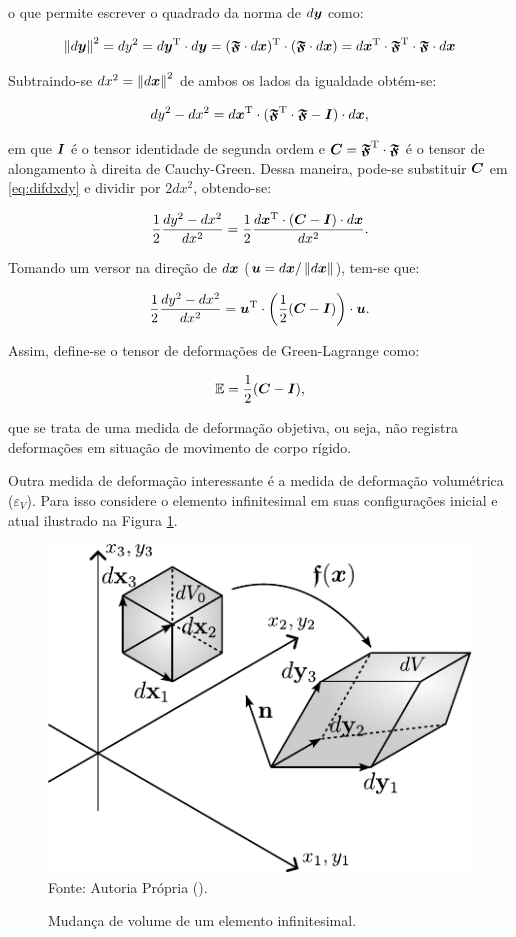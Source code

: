 \noindent o que permite escrever o quadrado da norma de $d\boldsymbol{y}$ como:

\[
    \left\lVert{d\boldsymbol{y}}\right\lVert^2=dy^2=d\boldsymbol{y}^\mathrm{T}\cdot d\boldsymbol{y}=(\boldsymbol{\mathfrak{F}}\cdot d\boldsymbol{x})^\mathrm{T}\cdot(\boldsymbol{\mathfrak{F}}\cdot d\boldsymbol{x})=d\boldsymbol{x}^\mathrm{T}\cdot\boldsymbol{\mathfrak{F}}^\mathrm{T}\cdot\boldsymbol{\mathfrak{F}}\cdot d\boldsymbol{x}
\]

Subtraindo-se $dx^2=\left\lVert{d\boldsymbol{x}}\right\lVert^2$ de ambos os lados da igualdade obtém-se:

\begin{equation}
    dy^2-dx^2=d\boldsymbol{x}^\mathrm{T}\cdot(\boldsymbol{\mathfrak{F}}^\mathrm{T}\cdot\boldsymbol{\mathfrak{F}}-\boldsymbol{I})\cdot d\boldsymbol{x}\text{,}
    \label{eq:difdxdy}
\end{equation}

\noindent em que $\boldsymbol{I}$ é o tensor identidade de segunda ordem e $\boldsymbol{C}=\boldsymbol{\mathfrak{F}}^\mathrm{T}\cdot\boldsymbol{\mathfrak{F}}$ é o tensor de alongamento à direita de Cauchy-Green. Dessa maneira, pode-se substituir $\boldsymbol{C}$ em \eqref{eq:difdxdy} e dividir por $2dx^2$, obtendo-se:

\[
    \frac{1}{2}\frac{dy^2-dx^2}{dx^2}=\frac{1}{2}\frac{d\boldsymbol{x}^\mathrm{T}\cdot(\boldsymbol{C}-\boldsymbol{I})\cdot d\boldsymbol{x}}{dx^2}\text{.}
\]

\noindent Tomando um versor na direção de $d\boldsymbol{x}$ ($\boldsymbol{u}=d\boldsymbol{x}/\left\lVert{d\boldsymbol{x}}\right\lVert$), tem-se que:

\begin{equation}
    \frac{1}{2}\frac{dy^2-dx^2}{dx^2}=\boldsymbol{u}^\mathrm{T}\cdot\left(\frac{1}{2}(\boldsymbol{C}-\boldsymbol{I})\right)\cdot\boldsymbol{u}\text{.}
\end{equation}

Assim, define-se o tensor de deformações de Green-Lagrange como:

\begin{equation}
    \mathbb{E}=\frac{1}{2}(\boldsymbol{C}-\boldsymbol{I})\text{,}
    \label{eq:CSD-DefGreenLagr}
\end{equation}

\noindent que se trata de uma medida de deformação objetiva, ou seja, não registra deformações em situação de movimento de corpo rígido.

Outra medida de deformação interessante é a medida de deformação volumétrica ($\varepsilon_V$). Para isso considere o elemento infinitesimal em suas configurações inicial e atual ilustrado na Figura \ref{fig:MudVol}.

\begin{figure}[h!]
    \centering
    \caption{Mudança de volume de um elemento infinitesimal.}
    \includegraphics[width=0.5\linewidth]{Figuras/MudVol.pdf}
    \\Fonte: Autoria Própria (\the\year).
    \label{fig:MudVol}
\end{figure}

